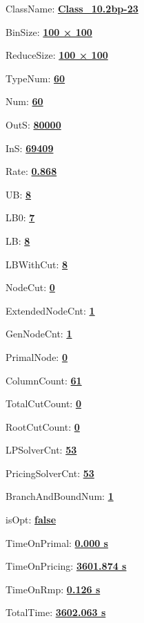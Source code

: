 \documentclass[11pt]{article}
\begin{document}
\pagestyle{empty}


ClassName: \underline{\textbf{Class_10.2bp-23}}
\par
BinSize: \underline{\textbf{100 × 100}}
\par
ReduceSize: \underline{\textbf{100 × 100}}
\par
TypeNum: \underline{\textbf{60}}
\par
Num: \underline{\textbf{60}}
\par
OutS: \underline{\textbf{80000}}
\par
InS: \underline{\textbf{69409}}
\par
Rate: \underline{\textbf{0.868}}
\par
UB: \underline{\textbf{8}}
\par
LB0: \underline{\textbf{7}}
\par
LB: \underline{\textbf{8}}
\par
LBWithCut: \underline{\textbf{8}}
\par
NodeCut: \underline{\textbf{0}}
\par
ExtendedNodeCnt: \underline{\textbf{1}}
\par
GenNodeCnt: \underline{\textbf{1}}
\par
PrimalNode: \underline{\textbf{0}}
\par
ColumnCount: \underline{\textbf{61}}
\par
TotalCutCount: \underline{\textbf{0}}
\par
RootCutCount: \underline{\textbf{0}}
\par
LPSolverCnt: \underline{\textbf{53}}
\par
PricingSolverCnt: \underline{\textbf{53}}
\par
BranchAndBoundNum: \underline{\textbf{1}}
\par
isOpt: \underline{\textbf{false}}
\par
TimeOnPrimal: \underline{\textbf{0.000 s}}
\par
TimeOnPricing: \underline{\textbf{3601.874 s}}
\par
TimeOnRmp: \underline{\textbf{0.126 s}}
\par
TotalTime: \underline{\textbf{3602.063 s}}
\par
\newpage


\end{document}
